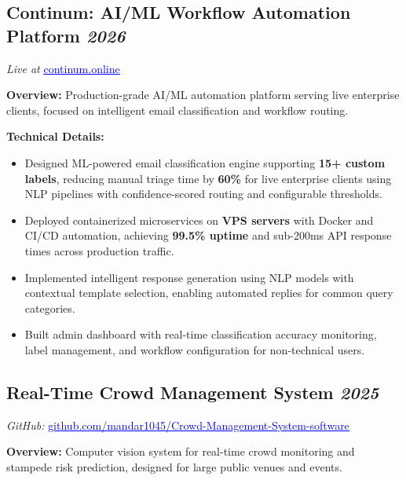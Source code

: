 \documentclass[letterpaper,10pt]{article}
\begin{document}
\vspace{6pt}
\subsection{Continum: AI/ML Workflow Automation Platform \hfill \normalfont\textit{2026}}
\noindent
\textit{Live at} \href{https://continum.online}{\textcolor{blue}{\underline{continum.online}}}

\vspace{4pt}
\noindent
\textbf{Overview:} Production-grade AI/ML automation platform serving live enterprise clients, focused on intelligent email classification and workflow routing.

\vspace{4pt}
\noindent\textbf{Technical Details:}
\begin{itemize}
  \item Designed ML-powered email classification engine supporting \textbf{15+ custom labels}, reducing manual triage time by \textbf{60\%} for live enterprise clients using NLP pipelines with confidence-scored routing and configurable thresholds.
  \item Deployed containerized microservices on \textbf{VPS servers} with Docker and CI/CD automation, achieving \textbf{99.5\% uptime} and sub-200ms API response times across production traffic.
  \item Implemented intelligent response generation using NLP models with contextual template selection, enabling automated replies for common query categories.
  \item Built admin dashboard with real-time classification accuracy monitoring, label management, and workflow configuration for non-technical users.
\end{itemize}

\vspace{6pt}
\subsection{Real-Time Crowd Management System \hfill \normalfont\textit{2025}}
\noindent
\textit{GitHub:} \href{https://github.com/mandar1045/Crowd-Management-System-software}{\textcolor{blue}{\underline{github.com/mandar1045/Crowd-Management-System-software}}}

\vspace{4pt}
\noindent
\textbf{Overview:} Computer vision system for real-time crowd monitoring and stampede risk prediction, designed for large public venues and events.
\end{document}
